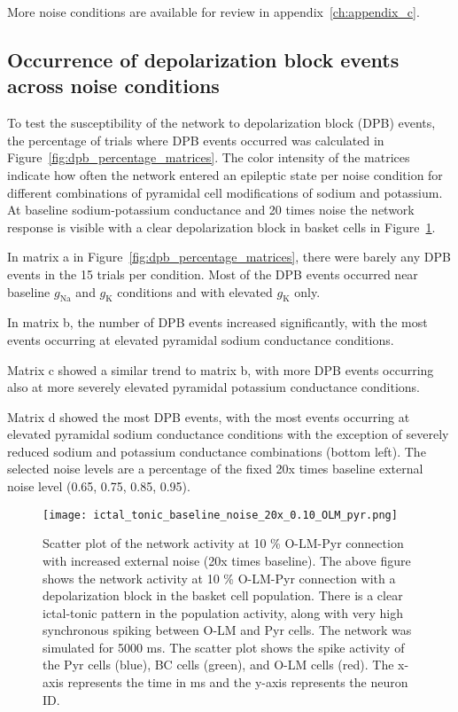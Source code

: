 \noindent More noise conditions are available for review in appendix~\ref{ch:appendix_c}.

\subsection{Occurrence of depolarization block events across noise conditions}
To test the susceptibility of the network to depolarization block (DPB) events, the percentage of trials where DPB events occurred was calculated in Figure~\ref{fig:dpb_percentage_matrices}.
The color intensity of the matrices indicate how often the network entered an epileptic state per noise condition for different combinations of pyramidal cell modifications of sodium and potassium.
At baseline sodium-potassium conductance and 20 times noise the network response is visible with a clear depolarization block in basket cells in Figure~\ref{fig:scatterplot_1_con_olm_pyr_ext_noise_20x}.

In matrix a in Figure~\ref{fig:dpb_percentage_matrices}, there were barely any DPB events in the 15 trials per condition. Most of the DPB events occurred near baseline \(g_{\text{Na}}\) and \(g_{\text{K}}\) conditions and with elevated \(g_{\text{K}}\) only.

In matrix b, the number of DPB events increased significantly, with the most events occurring at elevated pyramidal sodium conductance conditions.

Matrix c showed a similar trend to matrix b, with more DPB events occurring also at more severely elevated pyramidal potassium conductance conditions.

Matrix d showed the most DPB events, with the most events occurring at elevated pyramidal sodium conductance conditions with the exception of severely reduced sodium and potassium conductance combinations (bottom left).
The selected noise levels are a percentage of the fixed 20x times baseline external noise level (0.65, 0.75, 0.85, 0.95).

\begin{figure}[htbp]
    \centering
    \texttt{[image: ictal\_tonic\_baseline\_noise\_20x\_0.10\_OLM\_pyr.png]}
    \caption[10 \% O-LM-Pyr connection with increased external noise scatter plot]{Scatter plot of the network activity at 10 \% O-LM-Pyr connection with increased external noise (20x times baseline).
        The above figure shows the network activity at 10 \% O-LM-Pyr connection with a depolarization block in the basket cell population.
        There is a clear ictal-tonic pattern in the population activity, along with very high synchronous spiking between O-LM and Pyr cells.
        The network was simulated for 5000 ms.
        The scatter plot shows the spike activity of the Pyr cells (blue), BC cells (green), and O-LM cells (red).
        The x-axis represents the time in ms and the y-axis represents the neuron ID\@.}\label{fig:scatterplot_1_con_olm_pyr_ext_noise_20x}
\end{figure}
\pagebreak

